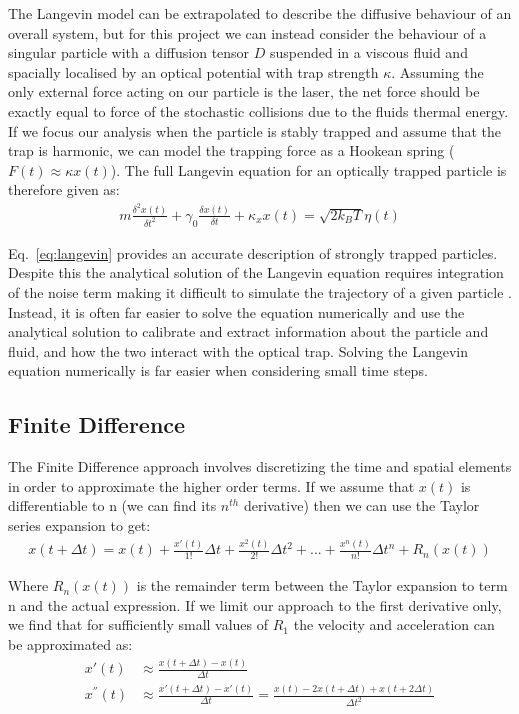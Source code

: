 The Langevin model can be extrapolated to describe the diffusive 
behaviour of an overall system, but for this project we can 
instead consider the behaviour of a singular particle with a diffusion 
tensor $D$ suspended in a viscous fluid and spacially localised 
by an optical potential with trap strength $\kappa$. Assuming the 
only external force acting on our particle is the laser, the net 
force should be exactly equal to force of the stochastic collisions 
due to the fluids thermal energy. If we focus our analysis when 
the particle is stably trapped and assume that the trap is harmonic, 
we can model the trapping force as a Hookean spring ($F(t) \approx 
\kappa x(t)$). The full Langevin equation for an optically trapped 
particle is therefore given as:
\begin{align}
	\label{eq:langevin}
	m\frac{\delta^2x(t)}{\delta t^2} + \gamma_0 \frac{\delta x(t)}{\delta t} + \kappa_x x(t) = \sqrt{2k_BT}\eta(t)
\end{align}

Eq.~\eqref{eq:langevin} provides an accurate description of strongly 
trapped particles. Despite this the analytical solution of the 
Langevin equation requires integration of the noise term making 
it difficult to simulate the trajectory of a given particle 
\cite{Volpe2013}. Instead, it is often far easier to solve the 
equation numerically and use the analytical solution to calibrate 
and extract information about the particle and fluid, and how the 
two interact with the optical trap. Solving the Langevin equation
numerically is far easier when considering small time steps.

\subsection{Finite Difference}
The Finite Difference approach involves discretizing the time and 
spatial elements in order to approximate the higher order terms. 
If we assume that $x(t)$ is differentiable to n (we can find its 
$n^{th}$ derivative) then we can use the Taylor series expansion 
to get:
\begin{align}
	x(t+\Delta t) = x(t)+\frac{x'(t)}{1!}\Delta t + \frac{x^2(t)}{2!}\Delta t^2+...+\frac{x^n(t)}{n!}\Delta t^n+R_n(x(t))	
\end{align}

Where $R_n(x(t))$ is the remainder term between the Taylor 
expansion to term n and the actual expression. If we limit our 
approach to the first derivative only, we find that for 
sufficiently small values of $R_1$ the velocity and acceleration 
can be approximated as:
\begin{align}
	x'(t) &\approx \frac{x(t+\Delta t)-x(t)}{\Delta t}
	\\
	x^{''}(t) &\approx \frac{x'(t+\Delta t)-x'(t)}{\Delta t} = \frac{x(t)-2x(t+\Delta t)+x(t+2\Delta t)}{\Delta t^2}
\end{align}

